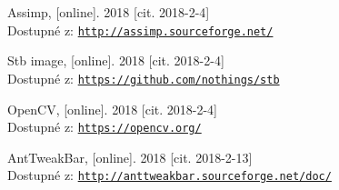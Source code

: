 \documentclass[czech,public,dept460,male,cpdeclaration]{diploma}
\begin{document}
\begin{thebibliography}{99}
	 Assimp,
		[online]. 2018 [cit. 2018-2-4]\\
		Dostupné z: \href{http://assimp.sourceforge.net/}{\texttt{http://assimp.sourceforge.net/}}
		
	 Stb image,
		[online]. 2018 [cit. 2018-2-4]\\
		Dostupné z: \href{https://github.com/nothings/stb}{\texttt{https://github.com/nothings/stb}}
		
	 OpenCV,
		[online]. 2018 [cit. 2018-2-4]\\
		Dostupné z: \href{https://opencv.org/}{\texttt{https://opencv.org/}}
		
	 AntTweakBar,
		[online]. 2018 [cit. 2018-2-13]\\
		Dostupné z: \href{http://anttweakbar.sourceforge.net/doc/}{\texttt{http://anttweakbar.sourceforge.net/doc/}}
		
\end{thebibliography}



\end{document}

